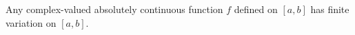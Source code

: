Any complex-valued absolutely continuous function $f$ defined on $[a, b]$ has finite variation on $[a, b]$.